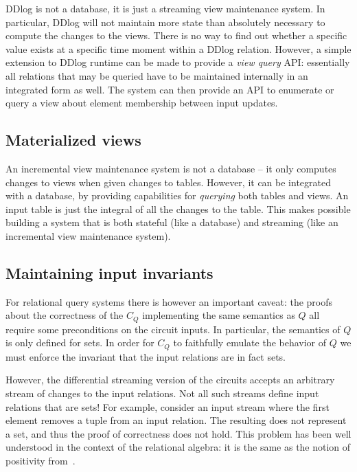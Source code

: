 DDlog is not a database, it is just a streaming view maintenance system.
In particular, DDlog will not maintain more state than absolutely necessary
to compute the changes to the views.  There is no way to find out whether 
a specific value exists at a specific time moment within a DDlog relation.
However, a simple extension to DDlog runtime can be made to provide a \emph{view query}
API: essentially all relations that may be queried have to be maintained 
internally in an integrated form as well.  The system can then provide
an API to enumerate or query a view about element membership between 
input updates.

\subsection{Materialized views}

An incremental view maintenance system is not a database -- it only computes changes
to views when given changes to tables.  However, it can be integrated with a 
database, by providing capabilities for \emph{querying} both tables and views.
An input table is just the integral of all the changes to the table.  This makes
possible building a system that is both stateful (like a database) and streaming
(like an incremental view maintenance system).

\subsection{Maintaining input invariants}

For relational query systems there is however an important caveat: 
the proofs about the correctness
of the $C_Q$ implementing the same semantics as $Q$ all require some 
preconditions on the circuit inputs.  In particular, the semantics of $Q$
is only defined for sets.  In order for $C_Q$ to faithfully emulate
the behavior of $Q$ we must enforce the invariant that the input
relations are in fact sets.  

However, the differential streaming version of the circuits accepts
an arbitrary stream of changes to the input relations.  Not all
such streams define input relations that are sets!  For example,
consider an input stream where the first element removes a
tuple from an input relation.  The resulting \zr does not represent
a set, and thus the proof of correctness does not hold.
This problem has been well understood in the context of the
relational algebra: it is the same as the notion of positivity from~\cite{green-tcs11}.

